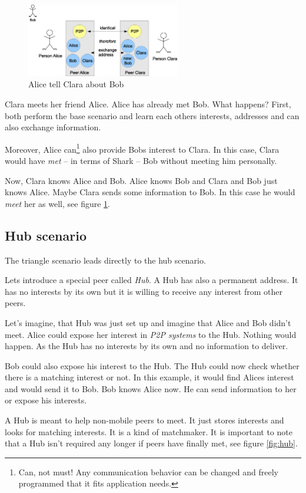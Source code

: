 \begin{figure}[t]
\centering
\includegraphics[width=0.60\textwidth]{triangle.eps}
\caption{Alice tell Clara about Bob}
\label{fig:triangle}
\end{figure}

Clara meets her friend Alice. Alice has already met Bob. What happens? First, both perform the base scenario and learn each others interests, addresses and can also exchange information.

Moreover, Alice can\footnote{Can, not must! Any communication behavior can be changed and freely programmed that it fits application needs.} also provide Bobs interest to Clara. In this case, Clara would have {\it met} -- in terms of Shark -- Bob without meeting him personally. 

Now, Clara knows Alice and Bob. Alice knows Bob and Clara and Bob just knows Alice. Maybe Clara sends some information to Bob. In this case he would {\it meet} her as well, see figure \ref{fig:triangle}.

\subsection{Hub scenario}
The triangle scenario leads directly to the hub scenario.

Lets introduce a special peer called {\it Hub}. A Hub has also a permanent address. It has no interests by its own but it is willing to receive any interest from other peers.

Let's imagine, that Hub was just set up and imagine that Alice and Bob didn't meet. Alice could expose her interest in {\it P2P systems} to the Hub. Nothing would happen. As the Hub has no interests by its own and no information to deliver.

Bob could also expose his interest to the Hub. The Hub could now check whether there is a matching interest or not. In this example, it would find Alices interest and would send it to Bob. Bob knows Alice now. He can send information to her or expose his interests.

A Hub is meant to help non-mobile peers to meet. It just stores interests and looks for matching interests. It is a kind of matchmaker. It is important to note that a Hub isn't required any longer if peers have finally met, see figure \ref{fig:hub}.

